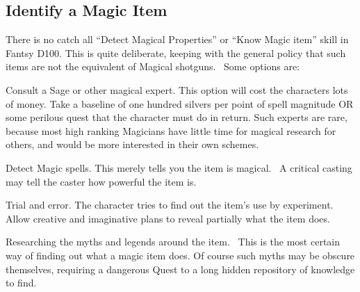 \subsection{Identify a Magic Item}
There is no catch all “Detect Magical Properties” or “Know Magic item” skill in Fantsy D100. This is quite deliberate, keeping with the general policy that such items are not the equivalent of Magical shotguns.  Some options are:

Consult a Sage or other magical expert. This option will cost the characters lots of money. Take a baseline of one hundred silvers per point of spell magnitude OR some perilous quest that the character must do in return. Such experts are rare, because most high ranking Magicians have little time for magical research for others, and would be more interested in their own schemes. 

Detect Magic spells. This merely tells you the item is magical.  A critical casting may tell the caster how powerful the item is.

Trial and error. The character tries to find out the item’s use by experiment. Allow creative and imaginative plans to reveal partially what the item does.

Researching the myths and legends around the item.  This is the most certain way of finding out what a magic item does. Of course such myths may be obscure themselves, requiring a dangerous Quest to a long hidden repository of knowledge to find.

\fi

